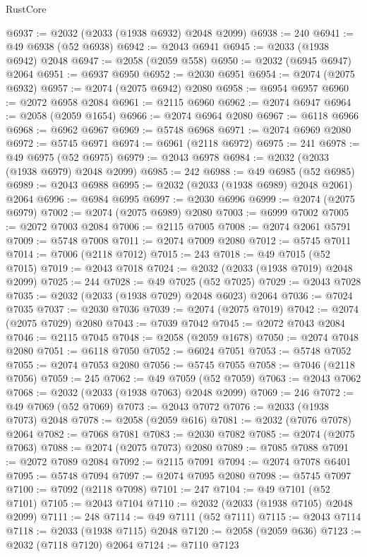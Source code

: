 \begin{lexlean}{RustCore}
\begin{coremodule}
@6937 := @2032 (@2033 (@1938 @6932) @2048 @2099)
@6938 := 240
@6941 := @49 @6938 (@52 @6938)
@6942 := @2043 @6941
@6945 := @2033 (@1938 @6942) @2048
@6947 := @2058 (@2059 @558)
@6950 := @2032 (@6945 @6947) @2064
@6951 := @6937 @6950
@6952 := @2030 @6951
@6954 := @2074 (@2075 @6932)
@6957 := @2074 (@2075 @6942) @2080
@6958 := @6954 @6957
@6960 := @2072 @6958 @2084
@6961 := @2115 @6960
@6962 := @2074 @6947
@6964 := @2058 (@2059 @1654)
@6966 := @2074 @6964 @2080
@6967 := @6118 @6966
@6968 := @6962 @6967
@6969 := @5748 @6968
@6971 := @2074 @6969 @2080
@6972 := @5745 @6971
@6974 := @6961 (@2118 @6972)
@6975 := 241
@6978 := @49 @6975 (@52 @6975)
@6979 := @2043 @6978
@6984 := @2032 (@2033 (@1938 @6979) @2048 @2099)
@6985 := 242
@6988 := @49 @6985 (@52 @6985)
@6989 := @2043 @6988
@6995 := @2032 (@2033 (@1938 @6989) @2048 @2061) @2064
@6996 := @6984 @6995
@6997 := @2030 @6996
@6999 := @2074 (@2075 @6979)
@7002 := @2074 (@2075 @6989) @2080
@7003 := @6999 @7002
@7005 := @2072 @7003 @2084
@7006 := @2115 @7005
@7008 := @2074 @2061 @5791
@7009 := @5748 @7008
@7011 := @2074 @7009 @2080
@7012 := @5745 @7011
@7014 := @7006 (@2118 @7012)
@7015 := 243
@7018 := @49 @7015 (@52 @7015)
@7019 := @2043 @7018
@7024 := @2032 (@2033 (@1938 @7019) @2048 @2099)
@7025 := 244
@7028 := @49 @7025 (@52 @7025)
@7029 := @2043 @7028
@7035 := @2032 (@2033 (@1938 @7029) @2048 @6023) @2064
@7036 := @7024 @7035
@7037 := @2030 @7036
@7039 := @2074 (@2075 @7019)
@7042 := @2074 (@2075 @7029) @2080
@7043 := @7039 @7042
@7045 := @2072 @7043 @2084
@7046 := @2115 @7045
@7048 := @2058 (@2059 @1678)
@7050 := @2074 @7048 @2080
@7051 := @6118 @7050
@7052 := @6024 @7051
@7053 := @5748 @7052
@7055 := @2074 @7053 @2080
@7056 := @5745 @7055
@7058 := @7046 (@2118 @7056)
@7059 := 245
@7062 := @49 @7059 (@52 @7059)
@7063 := @2043 @7062
@7068 := @2032 (@2033 (@1938 @7063) @2048 @2099)
@7069 := 246
@7072 := @49 @7069 (@52 @7069)
@7073 := @2043 @7072
@7076 := @2033 (@1938 @7073) @2048
@7078 := @2058 (@2059 @616)
@7081 := @2032 (@7076 @7078) @2064
@7082 := @7068 @7081
@7083 := @2030 @7082
@7085 := @2074 (@2075 @7063)
@7088 := @2074 (@2075 @7073) @2080
@7089 := @7085 @7088
@7091 := @2072 @7089 @2084
@7092 := @2115 @7091
@7094 := @2074 @7078 @6401
@7095 := @5748 @7094
@7097 := @2074 @7095 @2080
@7098 := @5745 @7097
@7100 := @7092 (@2118 @7098)
@7101 := 247
@7104 := @49 @7101 (@52 @7101)
@7105 := @2043 @7104
@7110 := @2032 (@2033 (@1938 @7105) @2048 @2099)
@7111 := 248
@7114 := @49 @7111 (@52 @7111)
@7115 := @2043 @7114
@7118 := @2033 (@1938 @7115) @2048
@7120 := @2058 (@2059 @636)
@7123 := @2032 (@7118 @7120) @2064
@7124 := @7110 @7123

\end{coremodule}
\end{lexlean}
